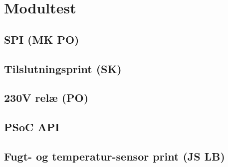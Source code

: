 \chapter{Modultest}

\section{SPI (MK PO)}


\section{Tilslutningsprint (SK)}


\section{230V relæ (PO)}


\section{PSoC API}


\section{Fugt- og temperatur-sensor print (JS LB)}

